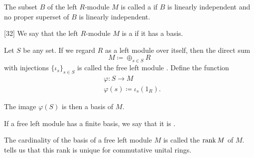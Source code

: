 \begin{definition}\label{def:left_module_basis}
  The subset \( B \) of the left \( R \)-module \( M \) is called a  if \( B \) is linearly independent and no proper superset of \( B \) is linearly independent.
\end{definition}

\begin{definition}\label{def:free_left_module}[32]\cite{Kocev2016}
  We say that the left \( R \)-module \( M \) is a  if it has a basis.

  Let \( S \) be any set. If we regard \( R \) as a left module over itself, then the direct sum
  \begin{equation*}
    M \coloneqq \oplus_{s \in S} R
  \end{equation*}
  with injections \( \{ \iota_s \}_{s \in S} \) is called the free left module . Define the function
  \begin{align*}
    &\varphi: S \to M \\
    &\varphi(s) \coloneqq \iota_s(1_R).
  \end{align*}

  The image \( \varphi(S) \) is then a basis of \( M \).

  If a free left module has a finite basis, we say that it is .

  The cardinality of the basis of a free left module \( M \) is called the  \( \operatorname{rank} M \) of \( M \).  tells us that this rank is unique for commutative unital rings.
\end{definition}

